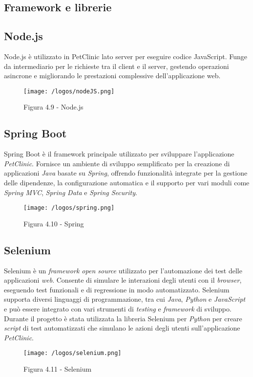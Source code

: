 \newpage
\subsection{Framework e librerie}
\subsection*{Node.js}
Node.js è utilizzato in PetClinic lato server per eseguire codice JavaScript. Funge da intermediario per le richieste tra il client e il server, gestendo operazioni asincrone e migliorando le prestazioni complessive dell'applicazione web.
\begin{figure}[H] 
    \centering 
    \texttt{[image: /logos/nodeJS.png]} 
    \caption{Figura 4.9 - Node.js}
\end{figure}

\vspace{1em}

\subsection*{Spring Boot}
Spring Boot è il framework principale utilizzato per sviluppare l'applicazione \emph{PetClinic}. Fornisce un ambiente di sviluppo semplificato per la creazione di applicazioni \emph{Java} basate su \emph{Spring}, offrendo funzionalità integrate per la gestione delle dipendenze, la configurazione automatica e il supporto per vari moduli come \emph{Spring MVC}, \emph{Spring Data} e \emph{Spring Security}.
\begin{figure}[H] 
    \centering 
    \texttt{[image: /logos/spring.png]} 
    \caption{Figura 4.10 - Spring}
\end{figure}

\vspace{1em}

\subsection*{Selenium}
Selenium è un \emph{framework open source} utilizzato per l'automazione dei test delle applicazioni \emph{web}. Consente di simulare le interazioni degli utenti con il \emph{browser}, eseguendo test funzionali e di regressione in modo automatizzato. Selenium supporta diversi linguaggi di programmazione, tra cui \emph{Java}, \emph{Python} e \emph{JavaScript} e può essere integrato con vari strumenti di \emph{testing} e \emph{framework} di sviluppo. Durante il progetto è stata utilizzata la libreria Selenium per \emph{Python} per creare \emph{script} di test automatizzati che simulano le azioni degli utenti sull'applicazione \emph{PetClinic}.
\begin{figure}[H] 
    \centering 
    \texttt{[image: /logos/selenium.png]} 
    \caption{Figura 4.11 - Selenium}
\end{figure}


